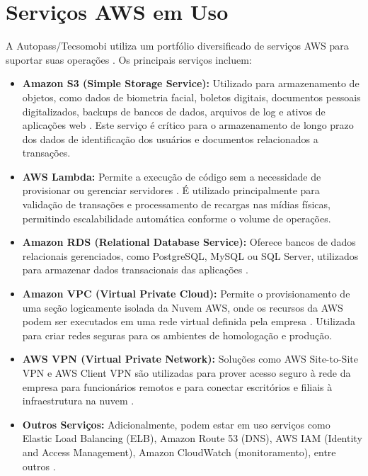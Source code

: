 \documentclass[
	12pt,				%
	oneside,			%
	a4paper,			%
	english,			%
	brazil				%
	]{abntex2unama}
\begin{document}
\section{Serviços AWS em Uso}
A Autopass/Tecsomobi utiliza um portfólio diversificado de serviços AWS para suportar suas operações \cite{cloud_infrastructure}. Os principais serviços incluem:
\begin{itemize}
	\item \textbf{Amazon S3 (Simple Storage Service):} Utilizado para armazenamento de objetos, como dados de biometria facial, boletos digitais, documentos pessoais digitalizados, backups de bancos de dados, arquivos de log e ativos de aplicações web \cite{datacenter_security}. Este serviço é crítico para o armazenamento de longo prazo dos dados de identificação dos usuários e documentos relacionados a transações.
	\item \textbf{AWS Lambda:} Permite a execução de código sem a necessidade de provisionar ou gerenciar servidores \cite{containerization}. É utilizado principalmente para validação de transações e processamento de recargas nas mídias físicas, permitindo escalabilidade automática conforme o volume de operações.
	\item \textbf{Amazon RDS (Relational Database Service):} Oferece bancos de dados relacionais gerenciados, como PostgreSQL, MySQL ou SQL Server, utilizados para armazenar dados transacionais das aplicações \cite{capacity_planning}.
	\item \textbf{Amazon VPC (Virtual Private Cloud):} Permite o provisionamento de uma seção logicamente isolada da Nuvem AWS, onde os recursos da AWS podem ser executados em uma rede virtual definida pela empresa \cite{network_fabric}. Utilizada para criar redes seguras para os ambientes de homologação e produção.
	\item \textbf{AWS VPN (Virtual Private Network):} Soluções como AWS Site-to-Site VPN e AWS Client VPN são utilizadas para prover acesso seguro à rede da empresa para funcionários remotos e para conectar escritórios e filiais à infraestrutura na nuvem \cite{datacenter_networking}.
	\item \textbf{Outros Serviços:} Adicionalmente, podem estar em uso serviços como Elastic Load Balancing (ELB), Amazon Route 53 (DNS), AWS IAM (Identity and Access Management), Amazon CloudWatch (monitoramento), entre outros \cite{software_defined}.
\end{itemize}
\end{document}
